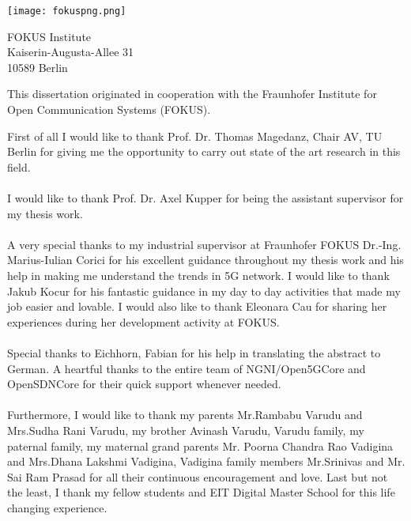\thispagestyle{empty}
\vspace*{3cm}


\begin{center}
\texttt{[image: fokuspng.png]}
\end{center}

\vspace*{0.2cm}

\begin{center}
FOKUS Institute\\
Kaiserin-Augusta-Allee 31\\
10589 Berlin\\
\end{center}
\vspace*{0.5cm}

\noindent This dissertation originated in cooperation with the Fraunhofer Institute for Open Communication Systems (FOKUS).

\vspace*{1cm}
\noindent 
First of all I would like to thank Prof. Dr. Thomas Magedanz, Chair AV, TU Berlin for giving me the opportunity to carry out state of the art research in this field. 
\\
\\
I would like to thank Prof. Dr. Axel Kupper for being the assistant supervisor for my thesis work.
\\
\\
A very special thanks to my industrial supervisor at Fraunhofer FOKUS Dr.-Ing. Marius-Iulian Corici for his excellent guidance throughout my thesis work and his help in making me understand the trends in 5G network. I would like to thank Jakub Kocur for his fantastic guidance in my day to day activities that made my job easier and lovable. I would also like to thank Eleonara Cau for sharing her experiences during her development activity at FOKUS.
\\
\\
Special thanks to Eichhorn, Fabian for his help in translating the abstract to German. A heartful thanks to the entire team of NGNI/Open5GCore and OpenSDNCore for their quick support whenever needed.
\\
\\
Furthermore, I would like to thank my parents Mr.Rambabu Varudu and Mrs.Sudha Rani Varudu, my brother Avinash Varudu, Varudu family, my paternal family, my maternal grand parents Mr. Poorna Chandra Rao Vadigina and Mrs.Dhana Lakshmi Vadigina, Vadigina family members Mr.Srinivas and Mr. Sai Ram Prasad for all their continuous encouragement and love. Last but not the least, I thank my fellow students and EIT Digital Master School for this life changing experience.